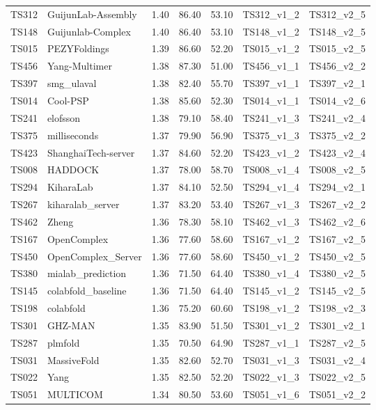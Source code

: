 \begin{longtable}{lllllll}
TS312 & GuijunLab-Assembly & 1.40 & 86.40 & 53.10 & TS312\_v1\_2 & TS312\_v2\_5 \\ 
TS148 & Guijunlab-Complex & 1.40 & 86.40 & 53.10 & TS148\_v1\_2 & TS148\_v2\_5 \\ 
TS015 & PEZYFoldings & 1.39 & 86.60 & 52.20 & TS015\_v1\_2 & TS015\_v2\_5 \\ 
TS456 & Yang-Multimer & 1.38 & 87.30 & 51.00 & TS456\_v1\_1 & TS456\_v2\_2 \\ 
TS397 & smg\_ulaval & 1.38 & 82.40 & 55.70 & TS397\_v1\_1 & TS397\_v2\_1 \\ 
TS014 & Cool-PSP & 1.38 & 85.60 & 52.30 & TS014\_v1\_1 & TS014\_v2\_6 \\ 
TS241 & elofsson & 1.38 & 79.10 & 58.40 & TS241\_v1\_3 & TS241\_v2\_4 \\ 
TS375 & milliseconds & 1.37 & 79.90 & 56.90 & TS375\_v1\_3 & TS375\_v2\_2 \\ 
TS423 & ShanghaiTech-server & 1.37 & 84.60 & 52.20 & TS423\_v1\_2 & TS423\_v2\_4 \\ 
TS008 & HADDOCK & 1.37 & 78.00 & 58.70 & TS008\_v1\_4 & TS008\_v2\_5 \\ 
TS294 & KiharaLab & 1.37 & 84.10 & 52.50 & TS294\_v1\_4 & TS294\_v2\_1 \\ 
TS267 & kiharalab\_server & 1.37 & 83.20 & 53.40 & TS267\_v1\_3 & TS267\_v2\_2 \\ 
TS462 & Zheng & 1.36 & 78.30 & 58.10 & TS462\_v1\_3 & TS462\_v2\_6 \\ 
TS167 & OpenComplex & 1.36 & 77.60 & 58.60 & TS167\_v1\_2 & TS167\_v2\_5 \\ 
TS450 & OpenComplex\_Server & 1.36 & 77.60 & 58.60 & TS450\_v1\_2 & TS450\_v2\_5 \\ 
TS380 & mialab\_prediction & 1.36 & 71.50 & 64.40 & TS380\_v1\_4 & TS380\_v2\_5 \\ 
TS145 & colabfold\_baseline & 1.36 & 71.50 & 64.40 & TS145\_v1\_2 & TS145\_v2\_5 \\ 
TS198 & colabfold & 1.36 & 75.20 & 60.60 & TS198\_v1\_2 & TS198\_v2\_3 \\ 
TS301 & GHZ-MAN & 1.35 & 83.90 & 51.50 & TS301\_v1\_2 & TS301\_v2\_1 \\ 
TS287 & plmfold & 1.35 & 70.50 & 64.90 & TS287\_v1\_1 & TS287\_v2\_5 \\ 
TS031 & MassiveFold & 1.35 & 82.60 & 52.70 & TS031\_v1\_3 & TS031\_v2\_4 \\ 
TS022 & Yang & 1.35 & 82.50 & 52.20 & TS022\_v1\_3 & TS022\_v2\_5 \\ 
TS051 & MULTICOM & 1.34 & 80.50 & 53.60 & TS051\_v1\_6 & TS051\_v2\_2 \\ 

\end{longtable}
